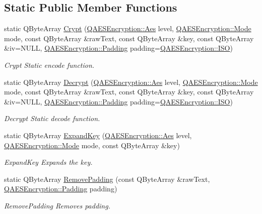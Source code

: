 \subsection*{Static Public Member Functions}
\begin{DoxyCompactItemize}
\item 
static Q\-Byte\-Array \hyperlink{class_q_a_e_s_encryption_a43819eeb6a7cb29fbd3cb6ad640dcbdf}{Crypt} (\hyperlink{class_q_a_e_s_encryption_abe48208f4f6c7d68e6a10b49b9d0b7bd}{Q\-A\-E\-S\-Encryption\-::\-Aes} level, \hyperlink{class_q_a_e_s_encryption_ad3e031c49a3d56566379d75b40b7b255}{Q\-A\-E\-S\-Encryption\-::\-Mode} mode, const Q\-Byte\-Array \&raw\-Text, const Q\-Byte\-Array \&key, const Q\-Byte\-Array \&iv=N\-U\-L\-L, \hyperlink{class_q_a_e_s_encryption_ab0a65cdea4eac21ef32530010d1b0247}{Q\-A\-E\-S\-Encryption\-::\-Padding} padding=\hyperlink{class_q_a_e_s_encryption_ab0a65cdea4eac21ef32530010d1b0247a4fb686e6a16d4242ff35311d2e7c422d}{Q\-A\-E\-S\-Encryption\-::\-I\-S\-O})
\begin{DoxyCompactList}\small\item\em Crypt Static encode function. \end{DoxyCompactList}\item 
static Q\-Byte\-Array \hyperlink{class_q_a_e_s_encryption_af9baa154a06683049d941bd06ac698fd}{Decrypt} (\hyperlink{class_q_a_e_s_encryption_abe48208f4f6c7d68e6a10b49b9d0b7bd}{Q\-A\-E\-S\-Encryption\-::\-Aes} level, \hyperlink{class_q_a_e_s_encryption_ad3e031c49a3d56566379d75b40b7b255}{Q\-A\-E\-S\-Encryption\-::\-Mode} mode, const Q\-Byte\-Array \&raw\-Text, const Q\-Byte\-Array \&key, const Q\-Byte\-Array \&iv=N\-U\-L\-L, \hyperlink{class_q_a_e_s_encryption_ab0a65cdea4eac21ef32530010d1b0247}{Q\-A\-E\-S\-Encryption\-::\-Padding} padding=\hyperlink{class_q_a_e_s_encryption_ab0a65cdea4eac21ef32530010d1b0247a4fb686e6a16d4242ff35311d2e7c422d}{Q\-A\-E\-S\-Encryption\-::\-I\-S\-O})
\begin{DoxyCompactList}\small\item\em Decrypt Static decode function. \end{DoxyCompactList}\item 
static Q\-Byte\-Array \hyperlink{class_q_a_e_s_encryption_a2112456e057e6dd886694348fbf202cd}{Expand\-Key} (\hyperlink{class_q_a_e_s_encryption_abe48208f4f6c7d68e6a10b49b9d0b7bd}{Q\-A\-E\-S\-Encryption\-::\-Aes} level, \hyperlink{class_q_a_e_s_encryption_ad3e031c49a3d56566379d75b40b7b255}{Q\-A\-E\-S\-Encryption\-::\-Mode} mode, const Q\-Byte\-Array \&key)
\begin{DoxyCompactList}\small\item\em Expand\-Key Expands the key. \end{DoxyCompactList}\item 
static Q\-Byte\-Array \hyperlink{class_q_a_e_s_encryption_abb2887bf5623a74053dd19627f3d3055}{Remove\-Padding} (const Q\-Byte\-Array \&raw\-Text, \hyperlink{class_q_a_e_s_encryption_ab0a65cdea4eac21ef32530010d1b0247}{Q\-A\-E\-S\-Encryption\-::\-Padding} padding)
\begin{DoxyCompactList}\small\item\em Remove\-Padding Removes padding. \end{DoxyCompactList}\end{DoxyCompactItemize}


